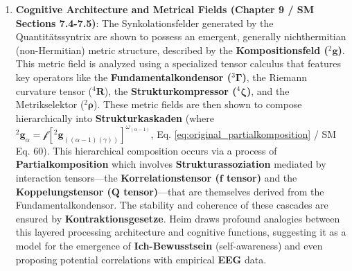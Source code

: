 \documentclass[12pt]{article}
\newcommand{\kompositionsfeld}{{}^2\mathbf{g}}
\newcommand{\partialstruktur}[1]{{}^2\mathbf{g}_{(#1)}} %
\newcommand{\fundamentalkondensor}{{}^3\bm{\Gamma}}
\newcommand{\korrelationstensor}{\mathbf{f}}
\newcommand{\koppelungstensor}{\mathbf{Q}}
\newcommand{\strukturkompressor}{{}^4\bm{\zeta}}
\begin{document}
\begin{enumerate}
    \item \textbf{Cognitive Architecture and Metrical Fields (Chapter 9 / SM Sections 7.4-7.5)}: The Synkolationsfelder generated by the Quantitätssyntrix are shown to possess an emergent, generally nichthermitian (non-Hermitian) metric structure, described by the \textbf{Kompositionsfeld (\( \kompositionsfeld \))}. This metric field is analyzed using a specialized tensor calculus that features key operators like the \textbf{Fundamentalkondensor (\( \fundamentalkondensor \))}, the Riemann curvature tensor (\( {}^4\mathbf{R} \)), the \textbf{Strukturkompressor (\( \strukturkompressor \))}, and the Metrikselektor (\( {}^2\bm{\rho} \)). These metric fields are then shown to compose hierarchically into \textbf{Strukturkaskaden} (where \( \kompositionsfeld_\alpha = \mathcal{f}[\partialstruktur{(\alpha-1)(\gamma)}]^{\omega_{(\alpha-1)}} \), Eq. \eqref{eq:original_partialkomposition} / SM Eq. 60). This hierarchical composition occurs via a process of \textbf{Partialkomposition} which involves \textbf{Strukturassoziation} mediated by interaction tensors—the \textbf{Korrelationstensor (\( \korrelationstensor \) tensor)} and the \textbf{Koppelungstensor (\( \koppelungstensor \) tensor)}—that are themselves derived from the Fundamentalkondensor. The stability and coherence of these cascades are ensured by \textbf{Kontraktionsgesetze}. Heim draws profound analogies between this layered processing architecture and cognitive functions, suggesting it as a model for the emergence of \textbf{Ich-Bewusstsein} (self-awareness) and even proposing potential correlations with empirical \textbf{EEG} data.


\end{enumerate}
\end{document}
